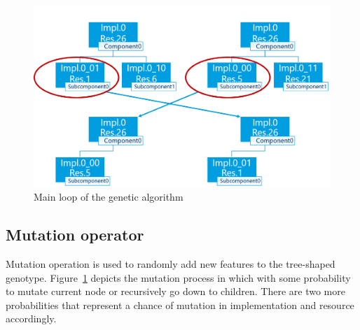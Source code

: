 \begin{figure}
	\centering
	\includegraphics[width=\textwidth]{images/GeneticSolverCrossover.png}
	\caption{Main loop of the genetic algorithm}
	\label{fig:GeneticSolverCrossover}
\end{figure}



\subsection{Mutation operator}
Mutation operation is used to randomly add new features to the tree-shaped genotype. Figure~\ref{fig:GeneticSolverCrossover} depicts the mutation process in which with some probability to mutate current node or recursively go down to children.
There are two more probabilities that represent a chance of mutation in implementation and resource accordingly. 

